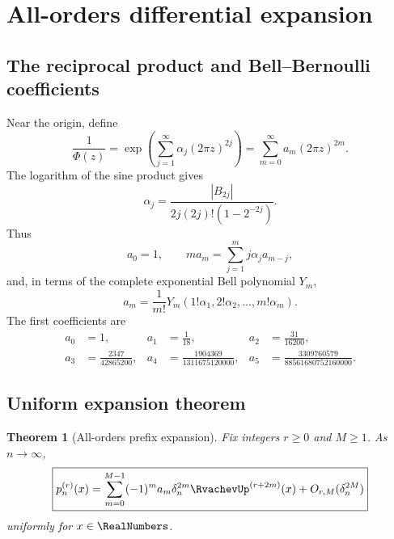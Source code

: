 \documentclass[11pt,oneside]{article}
\numberwithin{equation}{section}
\newtheorem{theorem}{Theorem}[section]
\theoremstyle{definition}
\theoremstyle{remark}
\begin{document}
\section{All-orders differential expansion}
\label{p3:sec:all-orders}

\subsection{The reciprocal product and Bell--Bernoulli coefficients}

Near the origin, define
\begin{equation}
 \frac1{\Phi(z)}
 =\exp\!\left(\sum_{j=1}^{\infty}\alpha_j(2\pi z)^{2j}\right)
 =\sum_{m=0}^{\infty}a_m(2\pi z)^{2m}.
 \label{p3:eq:reciprocal-series}
\end{equation}
The logarithm of the sine product gives
\begin{equation}
 \alpha_j=\frac{|B_{2j}|}{2j(2j)!(1-2^{-2j})}.
 \label{p3:eq:alpha-Bernoulli}
\end{equation}
Thus
\begin{equation}
 a_0=1,
 \qquad
 ma_m=\sum_{j=1}^{m}j\alpha_j a_{m-j},
 \label{p3:eq:a-recurrence}
\end{equation}
and, in terms of the complete exponential Bell polynomial $Y_m$,
\begin{equation}
 a_m=\frac1{m!}Y_m(1!\alpha_1,2!\alpha_2,\ldots,m!\alpha_m).
 \label{p3:eq:a-Bell}
\end{equation}
The first coefficients are
\begin{equation}
\begin{aligned}
 a_0&=1,&
 a_1&=\frac1{18},&
 a_2&=\frac{31}{16200},\\
 a_3&=\frac{2347}{42865200},&
 a_4&=\frac{1904369}{1311675120000},&
 a_5&=\frac{3309760579}{88561680752160000}.
\end{aligned}
 \label{p3:eq:first-a}
\end{equation}

\subsection{Uniform expansion theorem}

\begin{theorem}[All-orders prefix expansion]
\label{p3:thm:all-orders}
Fix integers $r\ge0$ and $M\ge1$.  As $n\to\infty$,
\begin{equation}
 \boxed{
 p_n^{(r)}(x)=
 \sum_{m=0}^{M-1}(-1)^m a_m\delta_n^{2m}\RvachevUp^{(r+2m)}(x)
 +O_{r,M}(\delta_n^{2M})}
 \label{p3:eq:all-orders}
\end{equation}
uniformly for $x\in\RealNumbers$.
\end{theorem}
\end{document}
